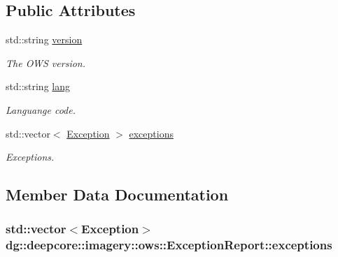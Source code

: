 \subsection*{Public Attributes}
\begin{DoxyCompactItemize}
\item 
std\+::string \hyperlink{structdg_1_1deepcore_1_1imagery_1_1ows_1_1_exception_report_aee7406892476149864fb6a4d683b8dbc}{version}
\begin{DoxyCompactList}\small\item\em The O\+WS version. \end{DoxyCompactList}\item 
std\+::string \hyperlink{structdg_1_1deepcore_1_1imagery_1_1ows_1_1_exception_report_a3cc19f5f1be081777526f2f32872f787}{lang}
\begin{DoxyCompactList}\small\item\em Languange code. \end{DoxyCompactList}\item 
std\+::vector$<$ \hyperlink{structdg_1_1deepcore_1_1imagery_1_1ows_1_1_exception}{Exception} $>$ \hyperlink{structdg_1_1deepcore_1_1imagery_1_1ows_1_1_exception_report_ae1a4d944b177a13ddb4253ab8bbbc979}{exceptions}
\begin{DoxyCompactList}\small\item\em Exceptions. \end{DoxyCompactList}\end{DoxyCompactItemize}


\subsection{Member Data Documentation}
\subsubsection[{\texorpdfstring{exceptions}{exceptions}}]{\setlength{\rightskip}{0pt plus 5cm}std\+::vector$<${\bf Exception}$>$ dg\+::deepcore\+::imagery\+::ows\+::\+Exception\+Report\+::exceptions}\hypertarget{structdg_1_1deepcore_1_1imagery_1_1ows_1_1_exception_report_ae1a4d944b177a13ddb4253ab8bbbc979}{}\label{structdg_1_1deepcore_1_1imagery_1_1ows_1_1_exception_report_ae1a4d944b177a13ddb4253ab8bbbc979}



